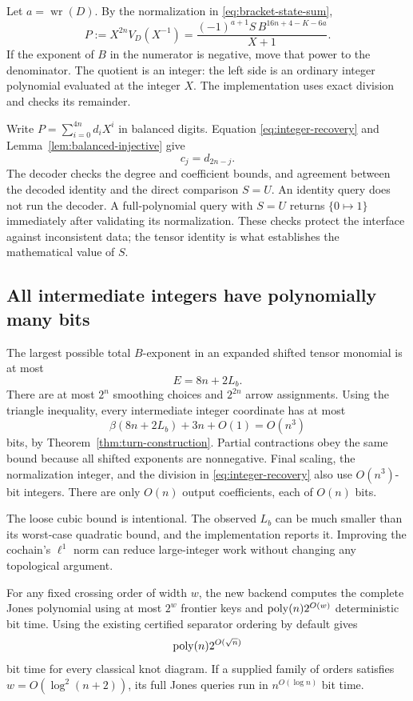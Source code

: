 Let $a=\operatorname{wr}(D)$. By the normalization in
\eqref{eq:bracket-state-sum},
\begin{equation}\label{eq:integer-recovery}
 P:=X^{2n}V_D(X^{-1})
   =\frac{(-1)^{a+1}S\,B^{16n+4-K-6a}}{X+1}.
\end{equation}
If the exponent of $B$ in the numerator is negative, move that power to
the denominator. The quotient is an integer: the left side is an
ordinary integer polynomial evaluated at the integer $X$.
The implementation uses exact division and checks its remainder.

Write $P=\sum_{i=0}^{4n}d_iX^i$ in balanced digits. Equation
\eqref{eq:integer-recovery} and Lemma~\ref{lem:balanced-injective} give
\[
 c_j=d_{2n-j}.
\]
The decoder checks the degree and coefficient bounds, and agreement
between the decoded identity and the direct comparison $S=U$. An identity
query does not run the decoder. A full-polynomial query with $S=U$ returns
$\{0\mapsto1\}$ immediately after validating its normalization.
These checks protect the interface against inconsistent data; the tensor
identity is what establishes the mathematical value of $S$.

\subsection{All intermediate integers have polynomially many bits}

The largest possible total $B$-exponent in an expanded shifted tensor
monomial is at most
\[
 E=8n+2L_b.
\]
There are at most $2^n$ smoothing choices and $2^{2n}$ arrow assignments.
Using the triangle inequality, every intermediate integer coordinate
has at most
\begin{equation}\label{eq:bit-bound}
 \beta(8n+2L_b)+3n+O(1)=O(n^3)
\end{equation}
bits, by Theorem~\ref{thm:turn-construction}. Partial contractions obey
the same bound because all shifted exponents are nonnegative. Final
scaling, the normalization integer, and the division in
\eqref{eq:integer-recovery} also use $O(n^3)$-bit integers.
There are only $O(n)$ output coefficients, each of $O(n)$ bits.

The loose cubic bound is intentional. The observed $L_b$ can be much
smaller than its worst-case quadratic bound, and the implementation
reports it. Improving the cochain's $\ell^1$ norm can reduce large-integer
work without changing any topological argument.

\begin{theorem}
\label{thm:full-jones}
For any fixed crossing order of width $w$, the new backend computes the
complete Jones polynomial using at most $2^w$ frontier keys and
$\operatorname{poly}(n)2^{O(w)}$ deterministic bit time. Using the existing certified
separator ordering by default gives
\[
 \operatorname{poly}(n)2^{O(\sqrt n)}
\]
bit time for every classical knot diagram. If a supplied family of
orders satisfies $w=O(\log^2(n+2))$, its full Jones queries run in
$n^{O(\log n)}$ bit time.
\end{theorem}

